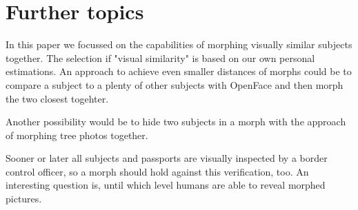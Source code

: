 \section{Further topics}
\label{FurtherTopics}
In this paper we focussed on the capabilities of morphing visually similar subjects together. The selection if "visual similarity" is based on our own personal estimations. An approach to achieve even smaller distances of morphs could be to compare a subject to a plenty of other subjects with OpenFace and then morph the two closest togehter. 


Another possibility would be to hide two subjects in a morph with the approach of morphing tree photos together. 


Sooner or later all subjects and passports are visually inspected by a border control officer, so a morph should hold against this verification, too. An interesting question is, until which level humans are able to reveal morphed pictures.